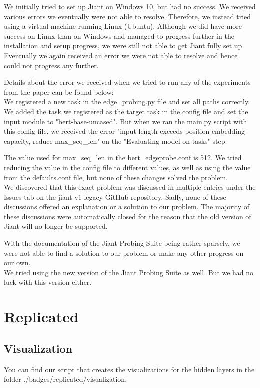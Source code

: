 \documentclass{article}
\begin{document}
	We initially tried to set up Jiant on Windows 10, but had no success. We received various errors we eventually were not able to resolve. Therefore, we instead tried using a virtual machine running Linux (Ubuntu). Although we did have more success on Linux than on Windows and managed to progress further in the installation and setup progress, we were still not able to get Jiant fully set up. Eventually we again received an error we were not able to resolve and hence could not progress any further. 
	
	Details about the error we received when we tried to run any of the experiments from the paper can be found below:\\
	
	We registered a new task in the edge\_probing.py file and set all paths correctly. We added the task we registered as the target task in the config file and set the input module to "bert-base-uncased". But when we ran the main.py script with this config file, we received the error "input length exceeds position embedding capacity, reduce max\_seq\_len" on the "Evaluating model on tasks" step. 
	
	The value used for max\_seq\_len in the bert\_edgeprobe.conf is 512. We tried reducing the value in the config file to different values, as well as using the value from the defaults.conf file, but none of these changes solved the problem.\\
	
	We discovered that this exact problem was discussed in multiple entries under the Issues tab on the jiant-v1-legacy GitHub repository. Sadly, none of these discussions offered an explanation or a solution to our problem. The majority of these discussions were automatically closed for the reason that the old version of Jiant will no longer be supported.
	
	With the documentation of the Jiant Probing Suite being rather sparsely, we were not able to find a solution to our problem or make any other progress on our own.\\
	
	We tried using the new version of the Jiant Probing Suite as well. But we had no luck with this version either.
	
	\section{Replicated}
	\subsection{Visualization}
	You can find our script that creates the visualizations for the hidden layers in the folder ./badges/replicated/visualization.\\
	
\end{document}
